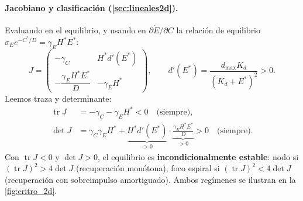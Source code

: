 \paragraph{Jacobiano y clasificación (\cref{sec:lineales2d}).} Evaluando en el equilibrio, y usando en $\partial\dot E/\partial C$ la relación de equilibrio $\sigma_E e^{-C^*/D}=\gamma_E H^* E^*$:
\begin{equation}
    J = \begin{pmatrix}
        -\gamma_C & H^* d'(E^*) \\[3pt]
        -\dfrac{\gamma_E H^* E^*}{D} & -\gamma_E H^*
    \end{pmatrix},
    \qquad d'(E^*) = \frac{d_{\max}K_d}{(K_d+E^*)^2}>0.
\end{equation}
Leemos traza y determinante:
\begin{align}
    \operatorname{tr}J &= -\gamma_C - \gamma_E H^* < 0 \quad\text{(siempre)},\\
    \det J &= \gamma_C\gamma_E H^* + \underbrace{H^* d'(E^*)}_{>0}\cdot\underbrace{\frac{\gamma_E H^* E^*}{D}}_{>0} > 0 \quad\text{(siempre)}.
\end{align}
Con $\operatorname{tr}J<0$ y $\det J>0$, el equilibrio es \textbf{incondicionalmente estable}: nodo si $(\operatorname{tr}J)^2>4\det J$ (recuperación monótona), foco espiral si $(\operatorname{tr}J)^2<4\det J$ (recuperación con sobreimpulso amortiguado). Ambos regímenes se ilustran en la \cref{fig:eritro_2d}.

